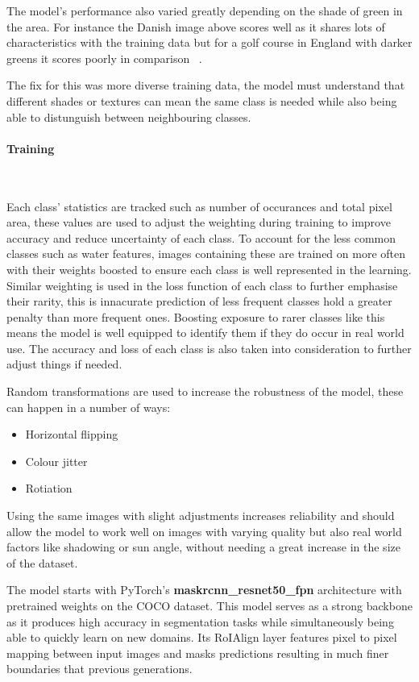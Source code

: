 \documentclass[final]{cmpreport_02}
\begin{document}
The model's performance also varied greatly depending on the shade of green in the area. For instance the Danish image above scores well as it shares lots of characteristics with the training data but for a golf course in England with darker greens it scores poorly in comparison ~.

The fix for this was more diverse training data, the model must understand that different shades or textures can mean the same class is needed while also being able to distunguish between neighbouring classes.

\paragraph{Training} \

Each class' statistics are tracked such as number of occurances and total pixel area, these values are used to adjust the weighting during training to improve accuracy and reduce uncertainty of each class.
To account for the less common classes such as water features, images containing these are trained on more often with their weights boosted to ensure each class is well represented in the learning.
Similar weighting is used in the loss function of each class to further emphasise their rarity, this is innacurate prediction of less frequent classes hold a greater penalty than more frequent ones.
Boosting exposure to rarer classes like this means the model is well equipped to identify them if they do occur in real world use.
The accuracy and loss of each class is also taken into consideration to further adjust things if needed.

Random transformations are used to increase the robustness of the model, these can happen in a number of ways:

\begin{itemize}
	\item{Horizontal flipping}
	\item{Colour jitter}
	\item{Rotiation}
\end{itemize}
Using the same images with slight adjustments increases reliability and should allow the model to work well on images with varying quality but also real world factors like shadowing or sun angle, without needing a great increase in the size of the dataset.

The model starts with PyTorch's \textbf{maskrcnn\_resnet50\_fpn} architecture with pretrained weights on the COCO \citep{coco} dataset.
This model serves as a strong backbone as it produces high accuracy in segmentation tasks while simultaneously being able to quickly learn on new domains.
Its RoIAlign layer features pixel to pixel mapping between input images and masks predictions resulting in much finer boundaries that previous generations.
\end{document}
